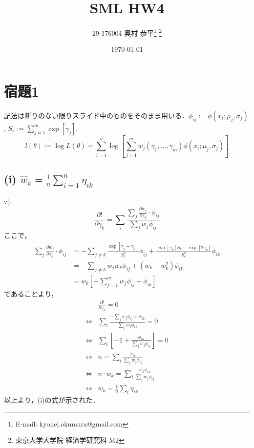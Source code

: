 \documentclass[11pt,a4paper,dvipdfmx]{article}
\theoremstyle{plain}
\renewcommand{\hat}{\widehat}
\newcommand{\equi}{\Longleftrightarrow}
\newcommand{\1}{\mbox{1}\hspace{-0.25em}\mbox{l}}
\begin{document}
\title{SML HW4}
\author{29-176004 奥村 恭平{\footnote{E-mail: kyohei.okumura@gmail.com}
\footnote{東京大学大学院 経済学研究科 M2}
}}
\date{\today}
\maketitle


\section*{宿題1}
記法は断りのない限りスライド中のものをそのまま用いる．$\phi_{ij} := \phi(x_i; \mu_j, \sigma_j)$, $S_e := \sum_{j=1}^m \exp[\gamma_j]$.
$$
l(\theta) := \log L(\theta) = \sum_{i=1}^n
\log
\left[
\sum_{j=1}^m w_j(\gamma_1, \dots, \gamma_m) \phi(x_i; \mu_j, \sigma_j)
\right]
$$

\subsection*{(i) $\hat{w}_k = \frac{1}{n} \sum_{i=1}^n \hat{\eta}_{ik}$}
$\because)$
\begin{equation*}
	\frac{\partial l}{\partial \gamma_k}
	= \sum_i \frac{\sum_j \frac{\partial w_j}{\partial \gamma_k} \cdot \phi_{ij}}{\sum_j w_j \phi_{ij}}
\end{equation*}
ここで，
\begin{align*}
	\sum_j \frac{\partial w_j}{\partial \gamma_k} \cdot \phi_{ij}
	&= - \sum_{j \neq k} \frac{\exp[\gamma_j + \gamma_k]}{S_e^2} \phi_{ij} + \frac{\exp[\gamma_k]S_e - \exp[2 \gamma_k]}{S_e^2} \phi_{ik} \\
	&= - \sum_{j \neq k} w_j w_k \phi_{ij} + (w_k - w_k^2) \phi_{ik} \\
	&= w_k \left[ -\sum_{j=1}^m w_j \phi_{ij} + \phi_{ik} \right]
\end{align*}
であることより，
\begin{align*}
	&\frac{\partial l}{\partial \gamma_k} = 0 \\
	\equi &\sum_i \frac{- \sum_j w_j \phi_{ij} + \phi_{ik}}{\sum_j w_j \phi_{ij}} = 0 \\
	\equi &\sum_i \left[ -1 + \frac{\phi_{ik}}{\sum_j w_j \phi_{ij}} \right] = 0 \\
	\equi &n = \sum_i \frac{\phi_{ik}}{\sum_j w_j \phi_{ij}} \\
	\equi &n \cdot w_k = \sum_i \frac{w_k \phi_{ik}}{\sum_j w_j \phi_{ij}}\\
	\equi &w_k = \frac{1}{n} \sum_i \eta_{ik}
\end{align*}
以上より，(i)の式が示された．
\end{document}
